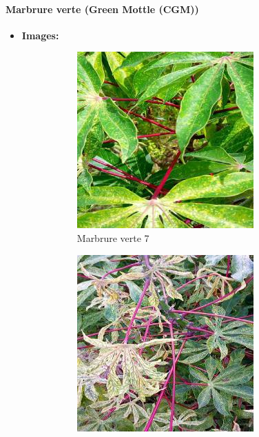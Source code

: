 \paragraph{Marbrure verte (Green Mottle (CGM))}
\begin{itemize}
	\item \textbf{Images: }
	\begin{figure}[htbp]
		\centering
		\begin{subfigure}[b]{0.3\textwidth}
			\centering
			\includegraphics[width=\textwidth]{images/7.jpg}
			\caption{Marbrure verte 7}
		\end{subfigure}
		\hfill
		\begin{subfigure}[b]{0.3\textwidth}
			\centering
			\includegraphics[width=\textwidth]{images/8.jpg}

\end{subfigure}
\end{figure}
\end{itemize}
